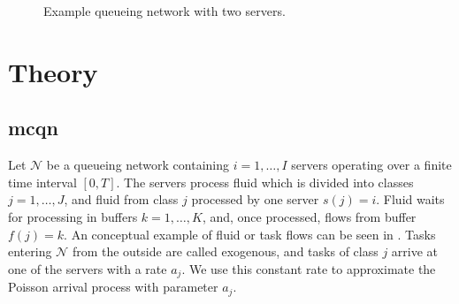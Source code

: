 \documentclass[11pt,a4paper,titlepage]{article}
\newcommand*{\qnet}{\ensuremath{\mathcal{N}}}%
\theoremstyle{definition}
\begin{document}
\begin{figure}
    \centering
    \caption[Example queueing network with two servers.]{
        \label{fig:queue-net}
        Example queueing network with two servers.
    }
\end{figure}

\section{Theory}
\label{sec:theory}


\subsection{\acrshort{mcqn}}
\label{subsec:theory:mcqn}

Let $\qnet$ be a queueing network containing $i = 1, \ldots, I$
servers operating over a finite time interval $[0,T]$.
The servers process fluid which is divided into classes $j = 1, \ldots, J$,
and fluid from class $j$ processed by one server $s(j) = i$.
Fluid waits for processing in buffers $k = 1, \ldots, K$,
and,
once processed,
flows from buffer $f(j) = k$.
An conceptual example of fluid or task flows can be seen in .
Tasks entering $\qnet$ from the outside are called exogenous,
and tasks of class $j$ arrive at one of the servers with a rate $a_j$.
We use this constant rate to approximate the Poisson arrival process
with parameter $a_j$.
\end{document}
